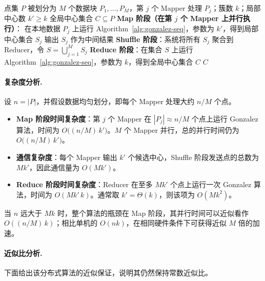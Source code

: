 \documentclass[lang=cn,newtx,10pt,scheme=chinese,chinesefont=nofont,citestyle=gb7714-2015, bibstyle=gb7714-2015]{elegantbook}
\begin{document}
\begin{refsection}
\begin{algorithm}[htbp]
  \caption{MapReduce 框架下的分布式 $k$-center 算法~\cite{malkomes2015fast}}
  \label{alg:mr-kcenter}
  \renewcommand{\algorithmicrequire}{\textbf{Input:}}%
    \renewcommand{\algorithmicensure}{\textbf{Output:}}%
  \begin{algorithmic}[1]
    \Require 点集 $P$ 被划分为 $M$ 个数据块 $P_1,\dots,P_M$，第 $j$ 个 Mapper 处理 $P_j$；簇数 $k$；局部中心数 $k' \ge k$
    \Ensure 全局中心集合 $C \subseteq P$
    \State \textbf{Map 阶段（在第 $j$ 个 Mapper 上并行执行）}：
    \State \hspace{1em} 在本地数据 $P_j$ 上运行 Algorithm~\ref{alg:gonzalez-seq}，参数为 $k'$，得到局部中心集合 $S_j$
    \State \hspace{1em} 输出 $S_j$ 作为中间结果
    \State \textbf{Shuffle 阶段}：系统将所有 $S_j$ 聚合到 Reducer，令 $S = \bigcup_{j=1}^M S_j$
    \State \textbf{Reduce 阶段}：在集合 $S$ 上运行 Algorithm~\ref{alg:gonzalez-seq}，参数为 $k$，得到全局中心集合 $C$
    \State \Return $C$
  \end{algorithmic}
\end{algorithm}

\paragraph{复杂度分析.}

设 $n = |P|$，并假设数据均匀划分，即每个 Mapper 处理大约 $n/M$ 个点。
\begin{itemize}
  \item \textbf{Map 阶段时间复杂度}：第 $j$ 个 Mapper 在 $|P_j| \approx n/M$ 个点上运行 Gonzalez 算法，时间为 $O\big((n/M)\,k'\big)$。$M$ 个 Mapper 并行，总的并行时间仍为 $O\big((n/M)\,k'\big)$。
  \item \textbf{通信复杂度}：每个 Mapper 输出 $k'$ 个候选中心，Shuffle 阶段发送点的总数为 $Mk'$，因此通信量为 $O(Mk')$。
  \item \textbf{Reduce 阶段时间复杂度}：Reducer 在至多 $Mk'$ 个点上运行一次 Gonzalez 算法，时间为 $O(Mk'\,k)$。通常取 $k' = \Theta(k)$，则该项为 $O(Mk^2)$。
\end{itemize}
当 $n$ 远大于 $Mk$ 时，整个算法的瓶颈在 Map 阶段，其并行时间可以近似看作 $O((n/M)\,k)$；相比单机的 $O(nk)$，在相同硬件条件下可获得近似 $M$ 倍的加速。

\paragraph{近似比分析.}
下面给出该分布式算法的近似保证，说明其仍然保持常数近似比。


\end{refsection}
\end{document}

